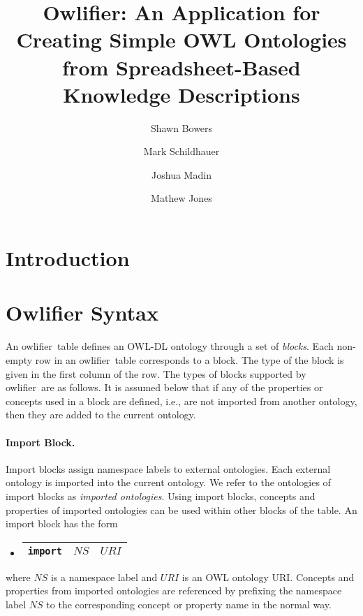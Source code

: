 \documentclass[11pt,onecolumn]{article}
\title{\textsf{Owlifier}: An Application for Creating Simple OWL
  Ontologies from Spreadsheet-Based Knowledge Descriptions}
\author{Shawn Bowers \and Mark Schildhauer \and Joshua Madin \and
  Mathew Jones}
\date{}
\newcommand{\owlifier}{\textsf{owlifier}}
\begin{document}
\maketitle

\begin{abstract}
\end{abstract}

\section{Introduction}


\section{\textsf{Owlifier} Syntax}

An \owlifier\ table defines an OWL-DL \cite{owl} ontology through a
set of \emph{blocks}.  Each non-empty row in an \owlifier\ table
corresponds to a block. The type of the block is given in the first
column of the row. The types of blocks supported by \owlifier\ are as
follows.  It is assumed below that if any of the properties or
concepts used in a block are defined, i.e., are not imported from
another ontology, then they are added to the current ontology.


\paragraph{Import Block.} Import blocks assign namespace labels to
external ontologies. Each external ontology is imported into the
current ontology. We refer to the ontologies of import blocks as
\emph{imported ontologies}.  Using import blocks, concepts and
properties of imported ontologies can be used within other blocks of
the table.  An import block has the form
\begin{itemize}
\item[]
  \begin{tabular}{|l|l|l|}\hline
    \texttt{import} & $\textit{NS}$ & $\textit{URI}$ \\ \hline
  \end{tabular}
\end{itemize}
where $\textit{NS}$ is a namespace label and $\textit{URI}$ is an OWL
ontology URI. Concepts and properties from imported ontologies are
referenced by prefixing the namespace label $\textit{NS}$ to the
corresponding concept or property name in the normal way.
\end{document}
